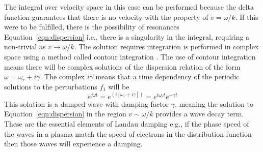 The integral over velocity space in this case can be performed because the delta function guarantees that there is no velocity with the property of $v = \omega/k$. If this were to be fulfilled, there is the possibility of resonances Equation~\ref{eqn:dispersion} i.e., there is a singularity in the integral, requiring a non-trivial as $v \rightarrow \omega/k$. The solution requires integration is performed in complex space using a method called contour integration \citep{melrose1989}. The use of contour integration means there will be complex solutions of the dispersion relation of the form $\omega = \omega_r + i\gamma$.
The complex $i\gamma$ means that a time dependency of the periodic solutions to the perturbations $f_1$ will be 
\begin{equation}
e^{j\omega t}=e^{(i[\omega_r + i\gamma])}=e^{i\omega_rt}e^{-\gamma t}
\label{eqn:growth}
\end{equation}
This solution is a damped wave with damping factor $\gamma$, meaning the solution to Equation~\ref{eqn:dispersion} in the region $v \sim \omega/k$ provides a wave decay term. These are the essential elements of Landau damping e.g., if the phase speed of the waves in a plasma match the speed of electrons in the distribution function then those waves will experience a damping.

